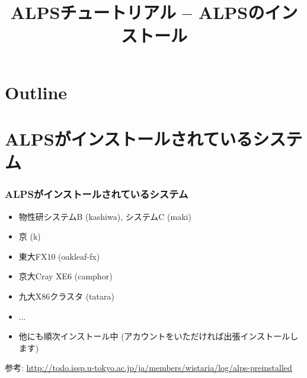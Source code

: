 \title{ALPSチュートリアル -- ALPSのインストール}



\begin{frame}
  \titlepage
\end{frame}

\section*{Outline}
\begin{frame}
  \tableofcontents
\end{frame}

\section{ALPSがインストールされているシステム}
\begin{frame}[fragile]
  \frametitle{ALPSがインストールされているシステム}
  \begin{itemize}
  \item 物性研システムB (kashiwa), システムC (maki)
  \item 京 (k)
  \item 東大FX10 (oakleaf-fx)
  \item 京大Cray XE6 (camphor)
  \item 九大X86クラスタ (tatara)
  \item ...
  \item 他にも順次インストール中 (アカウントをいただければ出張インストールします)
  \end{itemize}
\begin{semiverbatim}
参考: {\footnotesize\url{http://todo.issp.u-tokyo.ac.jp/ja/members/wistaria/log/alps-preinstalled}}
\end{semiverbatim}
\end{frame}

